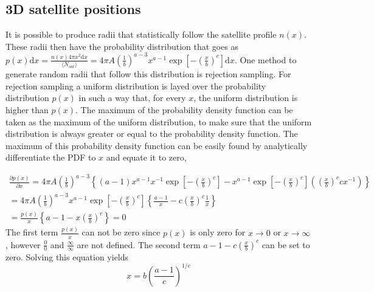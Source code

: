 \subsection{3D satellite positions}

It is possible to produce radii that statistically follow the satellite profile $n(x)$. These radii then have the probability distribution that goes as $p(x)\mathrm{d}x = \frac{n(x)4\pi x^2 \mathrm{d}x}{\langle N_{sat}\rangle} = 4\pi A \left(\frac{1}{b}\right)^{a-3} x^{a-1} \exp\left[-\left(\frac{x}{b}\right)^c\right]\mathrm{d}x$. One method to generate random radii that follow this distribution is rejection sampling. For rejection sampling a uniform distribution is layed over the probability distribution $p(x)$ in such a way that, for every $x$, the uniform distribution is higher than $p(x)$. The maximum of the probability density function can be taken as the maximum of the uniform distribution, to make sure that the uniform distribution is always greater or equal to the probability density function. The maximum of this probability density function can be easily found by analytically differentiate the PDF to $x$ and equate it to zero,

\begin{gather*}
\frac{\partial p(x)}{\partial x} = 4\pi A\left(\frac{1}{b}\right)^{a-3} \left\lbrace(a-1)x^{a-1}x^{-1}\exp\left[-\left(\frac{x}{b}\right)^c\right] - x^{a-1}\exp\left[-\left(\frac{x}{b}\right)^c\right]\left(\left(\frac{x}{b}\right)^c cx^{-1}\right)\right\rbrace\\
=4\pi A\left(\frac{1}{b}\right)^{a-3}x^{a-1}\exp\left[-\left(\frac{x}{b}\right)^c\right]\left\lbrace\frac{a-1}{x} - c\left(\frac{x}{b}\right)^c \frac{1}{x}\right\rbrace\\
= \frac{p(x)}{x}\left\lbrace a-1-x\left(\frac{x}{b}\right)^c\right\rbrace = 0
\end{gather*}
The first term $\frac{p(x)}{x}$ can not be zero since $p(x)$ is only zero for $x \rightarrow 0$ or $x \rightarrow \infty$, however $\frac{0}{0}$ and $\frac{\infty}{\infty}$ are not defined. The second term $a-1-c\left(\frac{x}{b}\right)^c$ can be set to zero. Solving this equation yields
\begin{equation}
x = b\left(\frac{a-1}{c}\right)^{1/c}
\end{equation}

